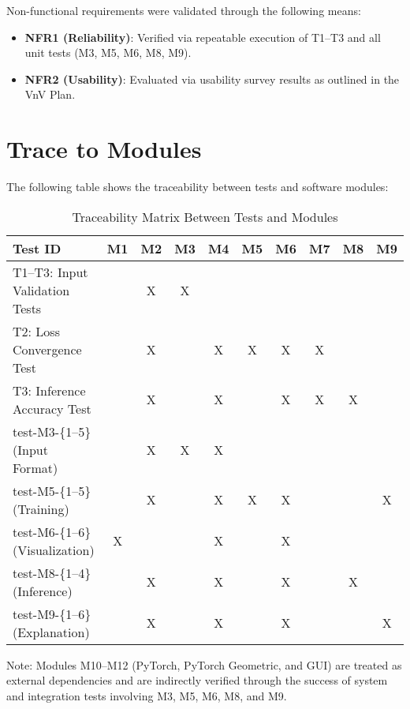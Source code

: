 \documentclass[12pt, titlepage]{article}
\begin{document}
Non-functional requirements were validated through the following means:
\begin{itemize}
    \item \textbf{NFR1 (Reliability)}: Verified via repeatable execution of T1–T3 and all unit tests (M3, M5, M6, M8, M9).
    \item \textbf{NFR2 (Usability)}: Evaluated via usability survey results as outlined in the VnV Plan.
\end{itemize}

		
\section{Trace to Modules}

The following table shows the traceability between tests and software modules:

\begin{table}[h!]
\centering
\begin{tabular}{|l|c|c|c|c|c|c|c|c|c|}
\hline
\textbf{Test ID} & \textbf{M1} & \textbf{M2} & \textbf{M3} & \textbf{M4} & \textbf{M5} & \textbf{M6} & \textbf{M7} & \textbf{M8} & \textbf{M9} \\
 \hline
T1–T3: Input Validation Tests  &  & X & X &  &  &  &  &  &  \\ \hline
T2: Loss Convergence Test      &  & X &  & X & X & X & X &  &  \\ \hline
T3: Inference Accuracy Test    &  & X &  & X &  & X & X & X &  \\ \hline
test-M3-\{1–5\} (Input Format) &  & X & X & X &  &  &  &  &  \\ \hline
test-M5-\{1–5\} (Training)     &  & X &  & X & X & X &  &  & X \\ \hline
test-M6-\{1–6\} (Visualization)& X &  &  & X &  & X &  &  &  \\ \hline
test-M8-\{1–4\} (Inference)    &  & X &  & X &  & X &  & X &  \\ \hline
test-M9-\{1–6\} (Explanation)  &  & X &  & X &  & X &  &  & X \\
\hline
\end{tabular}
\caption{Traceability Matrix Between Tests and Modules}
\label{Table:module_trace}
\end{table}

\noindent
Note: Modules M10–M12 (PyTorch, PyTorch Geometric, and GUI) are treated as external dependencies and are indirectly verified through the success of system and integration tests involving M3, M5, M6, M8, and M9.
	
\end{document}
